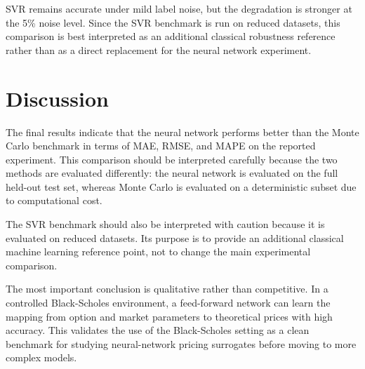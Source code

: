 SVR remains accurate under mild label noise, but the degradation is stronger at
the 5\% noise level.
Since the SVR benchmark is run on reduced datasets, this comparison is best
interpreted as an additional classical robustness reference rather than as a
direct replacement for the neural network experiment.

\section{Discussion}

The final results indicate that the neural network performs better than the Monte Carlo benchmark in terms of MAE, RMSE, and MAPE on the reported experiment.
This comparison should be interpreted carefully because the two methods are evaluated differently: the neural network is evaluated on the full held-out test set, whereas Monte Carlo is evaluated on a deterministic subset due to computational cost.

The SVR benchmark should also be interpreted with caution because it is evaluated on reduced datasets.
Its purpose is to provide an additional classical machine learning reference point, not to change the main experimental comparison.

The most important conclusion is qualitative rather than competitive.
In a controlled Black-Scholes environment, a feed-forward network can learn the mapping from option and market parameters to theoretical prices with high accuracy.
This validates the use of the Black-Scholes setting as a clean benchmark for studying neural-network pricing surrogates before moving to more complex models.
